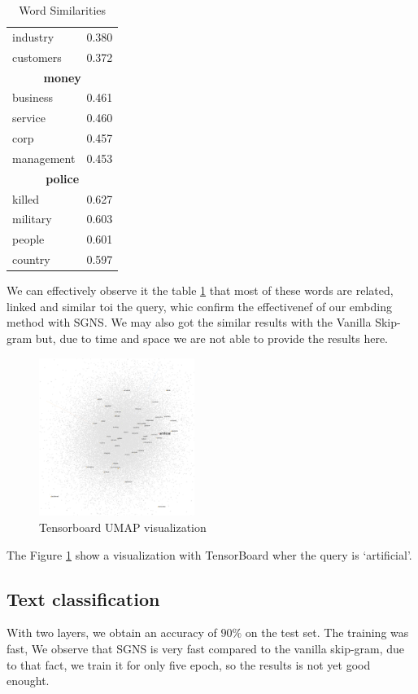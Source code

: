 \begin{table}[h]
\begin{minipage}{0.45\linewidth}
\begin{tabular}{ll}
			industry & 0.380 \\
			customers & 0.372 \\
			\bottomrule
			\multicolumn{2}{c}{\textbf{money}} \\
			\midrule
			business & 0.461 \\
			service & 0.460 \\
			corp & 0.457 \\
			management & 0.453 \\
			\bottomrule
			\multicolumn{2}{c}{\textbf{police}} \\
			\midrule
			killed & 0.627 \\
			military & 0.603 \\
			people & 0.601 \\
			country & 0.597 \\
			\bottomrule
		\end{tabular}
	\end{minipage}
	\caption{Word Similarities}
	\label{tab:word_similarities}
\end{table}


We can effectively observe it the table \ref{tab:word_similarities} that most of these words are related, linked and similar toi the query, whic confirm the effectivenef of our embding method with SGNS. We may also got the similar results with the Vanilla Skip-gram but, due to time and space we are not able to provide the results here.

\begin{figure}[H]\centering
	\includegraphics[width=0.45\textwidth]{figures/image.png}
\caption{Tensorboard UMAP visualization}
\label{fig:tboard}
\end{figure}
The Figure \ref{fig:tboard} show a visualization with TensorBoard wher the query is `artificial'.
\subsection{Text classification}
With two layers, we obtain an accuracy of $90\%$ on the test set. The training was fast,
We observe that SGNS is very fast compared to the vanilla skip-gram, due to that fact, we train it for only five epoch, so the results is not yet good enought.

